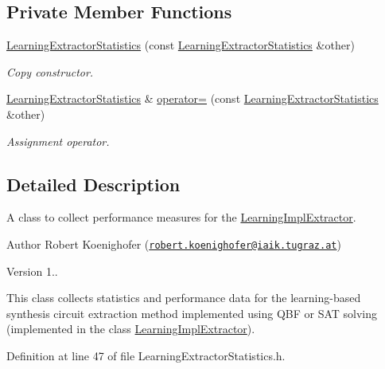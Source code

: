 \subsection*{Private Member Functions}
\begin{DoxyCompactItemize}
\item 
\hyperlink{classLearningExtractorStatistics_a08a5699815cf32793642c241ffccc766}{Learning\-Extractor\-Statistics} (const \hyperlink{classLearningExtractorStatistics}{Learning\-Extractor\-Statistics} \&other)
\begin{DoxyCompactList}\small\item\em Copy constructor. \end{DoxyCompactList}\item 
\hyperlink{classLearningExtractorStatistics}{Learning\-Extractor\-Statistics} \& \hyperlink{classLearningExtractorStatistics_a53e255629b25f52edb36cb82ca8d3a9d}{operator=} (const \hyperlink{classLearningExtractorStatistics}{Learning\-Extractor\-Statistics} \&other)
\begin{DoxyCompactList}\small\item\em Assignment operator. \end{DoxyCompactList}\end{DoxyCompactItemize}


\subsection{Detailed Description}
A class to collect performance measures for the \hyperlink{classLearningImplExtractor}{Learning\-Impl\-Extractor}. 

\begin{DoxyAuthor}{Author}
Robert Koenighofer (\href{mailto:robert.koenighofer@iaik.tugraz.at}{\tt robert.\-koenighofer@iaik.\-tugraz.\-at}) 
\end{DoxyAuthor}
\begin{DoxyVersion}{Version}
1..
\end{DoxyVersion}
This class collects statistics and performance data for the learning-\/based synthesis circuit extraction method implemented using Q\-B\-F or S\-A\-T solving (implemented in the class \hyperlink{classLearningImplExtractor}{Learning\-Impl\-Extractor}). 

Definition at line 47 of file Learning\-Extractor\-Statistics.\-h.



